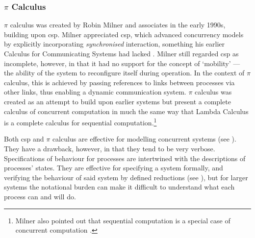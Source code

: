\subsubsection{\(\pi\) Calculus}
\(\pi\) calculus was created by Robin Milner and associates in the early 1990s, building upon \gls{csp}.  Milner appreciated \gls{csp}, which advanced concurrency models by explicitly incorporating \emph{synchronised} interaction, something his earlier Calculus for Communicating Systems \cite{Milner1980} had lacked  \cite{Milner1993}.  Milner still regarded \gls{csp} as incomplete, however, in that it had no support for the concept of `mobility' --- \ie{} the ability of the system to reconfigure itself during operation.  In the context of \(\pi\) calculus, this is achieved by passing references to links between processes via other links, thus enabling a dynamic communication system. \(\pi\) calculus was created as an attempt to build upon earlier systems but present a complete calculus of concurrent computation in much the same way that Lambda Calculus \cite{Barendregt1984} is a complete calculus for sequential computation.\footnote{Milner also pointed out that sequential computation is a special case of concurrent computation \cite{Milner1993}.}

Both \gls{csp} and \(\pi\) calculus are effective for modelling concurrent systems (see \eg{} \cite{Roscoe2011}).  They have a drawback, however, in that they tend to be very verbose.  Specifications of behaviour for processes are intertwined with the descriptions of processes' states.  They are effective for specifying a system formally, and verifying the behaviour of said system by defined reductions (see \eg{} \cite[Ch.~3.2]{Varela2013}), but for larger systems the notational burden can make it difficult to understand what each process can and will do.

